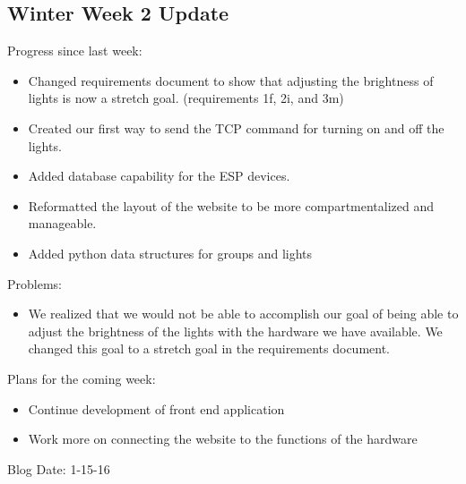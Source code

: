 \subsection{Winter Week 2 Update}
Progress since last week:
\begin{itemize}
   \item Changed requirements document to show that adjusting the brightness of lights is now a stretch goal. (requirements 1f, 2i, and 3m)
   \item Created our first way to send the TCP command for turning on and off the lights.
   \item Added database capability for the ESP devices.
   \item Reformatted the layout of the website to be more compartmentalized and manageable.
   \item Added python data structures for groups and lights
\end{itemize}
Problems:
\begin{itemize}
   \item We realized that we would not be able to accomplish our goal of being able to adjust the brightness of the lights with the hardware we have available. We changed this goal to a stretch goal in the requirements document.
\end{itemize}
Plans for the coming week:
\begin{itemize}
   \item Continue development of front end application
   \item Work more on connecting the website to the functions of the hardware
\end{itemize}
Blog Date: 1-15-16

